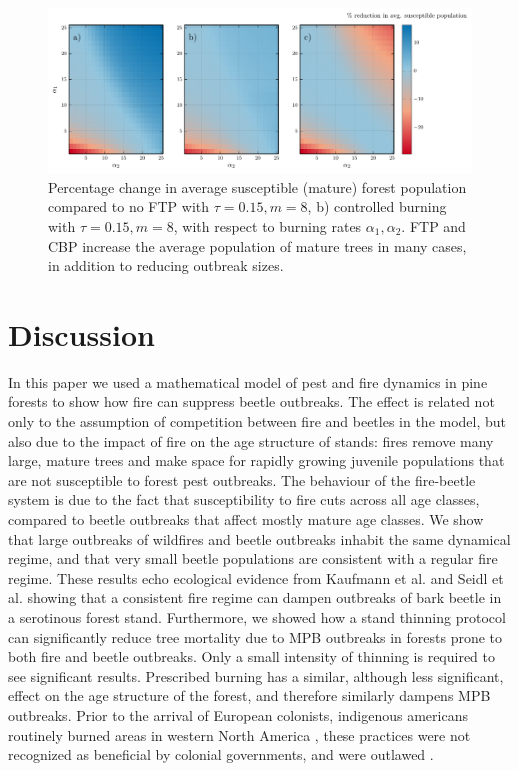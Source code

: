 \begin{figure}
  \includegraphics[width=\textwidth]{chapter_3/a1_a2_trim_susceptible_loss.pdf}
  \caption{Percentage change in average susceptible (mature) forest population compared to no FTP with  $\tau = 0.15, m = 8$, b) controlled burning with $\tau = 0.15, m = 8$,  with respect to burning rates $\alpha_1,\alpha_2$. FTP and CBP increase the average population of mature trees in many cases, in addition to reducing outbreak sizes.}
  \label{trim_susceptible}
\end{figure}
\section{Discussion}

In this paper we used a mathematical model of pest and fire dynamics in pine forests to show how fire can suppress beetle outbreaks. The effect is related not only to the assumption of competition between fire and beetles in the model, but also due to the impact of fire on the age structure of stands: fires remove many large, mature trees and make space for rapidly growing juvenile populations that are not susceptible to forest pest outbreaks. The behaviour of the fire-beetle system is due to the fact that susceptibility to fire cuts across all age classes, compared to beetle outbreaks that affect mostly mature age classes.  We show that large outbreaks of wildfires and beetle outbreaks inhabit the same dynamical regime, and that very small beetle populations are consistent with a regular fire regime.  These results echo ecological evidence from Kaufmann et al.\cite{kaufmann2008status} and Seidl et al.\cite{seidl2016spatial} showing that a consistent fire regime can dampen outbreaks of bark beetle in a serotinous forest stand.  Furthermore, we showed how a stand thinning protocol can significantly reduce tree mortality due to MPB outbreaks in forests prone to both fire and beetle outbreaks. Only a small intensity of thinning is required to see significant results. Prescribed burning has a similar, although less significant, effect on the age structure of the forest, and therefore similarly dampens MPB outbreaks. Prior to the arrival of European colonists, indigenous americans routinely burned areas in western North America \cite{barrett1982indian}, these practices were not recognized as beneficial by colonial governments, and were outlawed \cite{boyd1999indians}.

